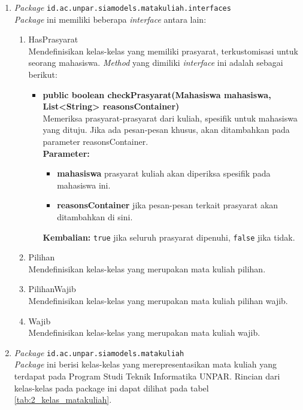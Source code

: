 \documentclass[a4paper,twoside]{article}
\begin{document}
\begin{enumerate}
\begin{enumerate}
\begin{enumerate}
	\item \textit{Package} \texttt{id.ac.unpar.siamodels.matakuliah.interfaces}\\
	\textit{Package} ini memiliki beberapa \textit{interface} antara lain:
	\begin{enumerate}
		\item HasPrasyarat\\
		Mendefinisikan kelas-kelas yang memiliki prasyarat, terkustomisasi untuk seorang mahasiswa. \textit{Method} yang dimiliki \textit{interface} ini adalah sebagai berikut: 
		\begin{itemize}
			\item \textbf{public boolean checkPrasyarat(Mahasiswa mahasiswa, List<String> reasonsContainer)} \\
			Memeriksa prasyarat-prasyarat dari kuliah, spesifik untuk mahasiswa yang dituju. Jika ada pesan-pesan khusus, akan ditambahkan pada parameter reasonsContainer.\\
			\textbf{Parameter:}
			\begin{itemize}
				\item \textbf{mahasiswa} prasyarat kuliah akan diperiksa spesifik pada mahasiswa ini.
				\item \textbf{reasonsContainer} jika pesan-pesan terkait prasyarat akan ditambahkan di sini.
			\end{itemize}
			\textbf{Kembalian:} \texttt{true} jika seluruh prasyarat dipenuhi, \texttt{false} jika tidak.
		\end{itemize}
		
		\item Pilihan\\
		Mendefinisikan kelas-kelas yang merupakan mata kuliah pilihan.
		\item PilihanWajib\\
		Mendefinisikan kelas-kelas yang merupakan mata kuliah pilihan wajib.
		\item Wajib\\
		Mendefinisikan kelas-kelas yang merupakan mata kuliah wajib.
	\end{enumerate}
	
	\item \textit{Package} \texttt{id.ac.unpar.siamodels.matakuliah}\\
	\textit{Package} ini berisi kelas-kelas yang merepresentasikan mata kuliah yang terdapat pada Program Studi Teknik Informatika UNPAR. Rincian dari kelas-kelas pada package ini dapat dilihat pada tabel \ref{tab:2_kelas_matakuliah}.


\end{enumerate}
\end{enumerate}
\end{enumerate}
\end{document}
